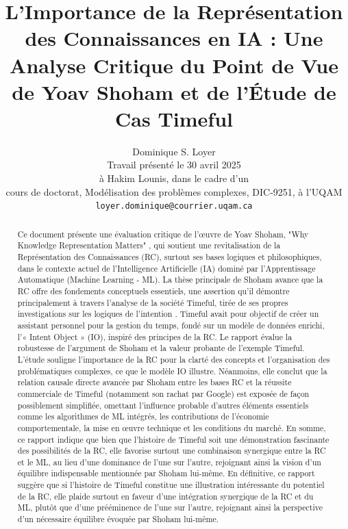 \documentclass[11pt,a4paper]{article}
\title{L'Importance de la Représentation des Connaissances en IA : Une Analyse Critique du Point de Vue de Yoav Shoham et de l'Étude de Cas Timeful}
\author{Dominique S. Loyer \\
  Travail présenté le 30 avril 2025 \\
  à Hakim Lounis, dans le cadre d'un \\
  cours de doctorat, Modélisation des problèmes complexes, DIC-9251, à l'UQAM \\
  \texttt{loyer.dominique@courrier.uqam.ca}}
\date{} %
\begin{document}
\maketitle

\begin{abstract}
Ce document présente une évaluation critique de l'œuvre de Yoav Shoham, "Why Knowledge Representation Matters" \citep{Shoham2015Why}, qui soutient une revitalisation de la Représentation des Connaissances (RC), surtout ses bases logiques et philosophiques, dans le contexte actuel de l'Intelligence Artificielle (IA) dominé par l'Apprentissage Automatique (Machine Learning - ML). La thèse principale de Shoham avance que la RC offre des fondements conceptuels essentiels, une assertion qu'il démontre principalement à travers l'analyse de la société Timeful, tirée de ses propres investigations sur les logiques de l'intention \citep{Shoham2009Logics}. Timeful avait pour objectif de créer un assistant personnel pour la gestion du temps, fondé sur un modèle de données enrichi, l'« Intent Object » (IO), inspiré des principes de la RC. Le rapport évalue la robustesse de l'argument de Shoham et la valeur probante de l'exemple Timeful. L'étude souligne l'importance de la RC pour la clarté des concepts et l'organisation des problématiques complexes, ce que le modèle IO illustre. Néanmoins, elle conclut que la relation causale directe avancée par Shoham entre les bases RC et la réussite commerciale de Timeful (notamment son rachat par Google) est exposée de façon possiblement simplifiée, omettant l'influence probable d'autres éléments essentiels comme les algorithmes de ML intégrés, les contributions de l'économie comportementale, la mise en œuvre technique et les conditions du marché. En somme, ce rapport indique que bien que l'histoire de Timeful soit une démonstration fascinante des possibilités de la RC, elle favorise surtout une combinaison synergique entre la RC et le ML, au lieu d'une dominance de l'une sur l'autre, rejoignant ainsi la vision d'un équilibre indispensable mentionnée par Shoham lui-même. En définitive, ce rapport suggère que si l'histoire de Timeful constitue une illustration intéressante du potentiel de la RC, elle plaide surtout en faveur d'une intégration synergique de la RC et du ML, plutôt que d'une prééminence de l'une sur l'autre, rejoignant ainsi la perspective d'un nécessaire équilibre évoquée par Shoham lui-même.
\end{abstract}
\end{document}
